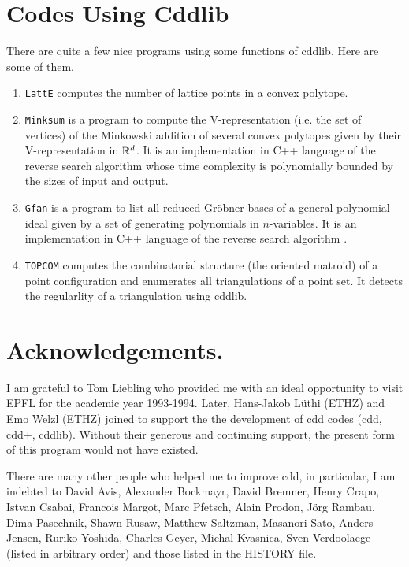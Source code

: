 \documentclass[11pt]{article}
\newcommand {\0} {{\bf 0}}
\newcommand{\R}{{\Bbb R}}
\begin{document}
\section{Codes Using Cddlib}  \label{USERCODES}

There are quite a few nice programs using some functions of cddlib.  
Here are some of them.


\begin{enumerate}

\item {\tt LattE} \cite{dhhhty-latte-05} computes the number of lattice points
in a convex polytope.

\item {\tt Minksum} \cite{w-msv-05} is a program to compute the V-representation
(i.e. the set of vertices) of the Minkowski addition of several convex polytopes
given by their V-representation in $\R^d$.  It is an implementation in C++ language 
of the reverse search algorithm \cite{f-fzctmacp-04} whose time complexity is
polynomially bounded by the sizes of input and output.

\item {\tt Gfan} \cite{j-gvum-05} is a program to list all reduced Gr\"obner
bases of a general polynomial ideal given by a set of generating polynomials
in $n$-variables.   It is an implementation in C++ language 
of the reverse search algorithm \cite{fjt-cgf-05}.


\item {\tt TOPCOM} \cite{r-topcom-05} computes the combinatorial structure
(the oriented matroid) of a point configuration and enumerates all triangulations
of a point set.   It detects the regularlity of a triangulation using cddlib.

\end{enumerate}


\section*{Acknowledgements.} 
I am  grateful to Tom  Liebling who
provided me with an ideal opportunity to visit EPFL
for the academic year 1993-1994.  Later, Hans-Jakob L\"uthi (ETHZ) and 
Emo Welzl  (ETHZ) joined to support the 
the development of cdd codes (cdd, cdd+, cddlib).
Without their generous and continuing support, the present form of 
this program would not have existed.

There are many other people who helped me to improve cdd, in particular,
I am indebted to  David Avis, 
Alexander Bockmayr, David Bremner, Henry Crapo, Istvan Csabai, 
Francois Margot, Marc Pfetsch, Alain Prodon, J\"org Rambau, Dima Pasechnik,
Shawn Rusaw, Matthew Saltzman, Masanori Sato, Anders Jensen,
Ruriko Yoshida, Charles Geyer, Michal Kvasnica, Sven Verdoolaege
 (listed in arbitrary order) and those listed
in the HISTORY file.




\end{document}
